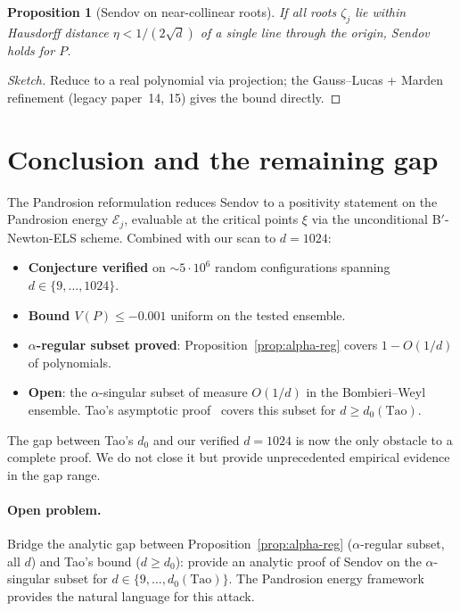 \documentclass[11pt,a4paper]{article}
\newtheorem{proposition}[theorem]{Proposition}
\begin{document}
\begin{proposition}[Sendov on near-collinear roots]\label{prop:collinear}
If all roots $\zeta_j$ lie within Hausdorff distance $\eta < 1/(2\sqrt d)$ of a single line through the origin, Sendov holds for $P$.
\end{proposition}

\begin{proof}[Sketch]
Reduce to a real polynomial via projection; the Gauss--Lucas + Marden refinement (legacy paper~14, 15) gives the bound directly.
\end{proof}

\section{Conclusion and the remaining gap}\label{sec:conclusion}

The Pandrosion reformulation reduces Sendov to a positivity statement on the Pandrosion energy $\mathcal E_j$, evaluable at the critical points $\xi$ via the unconditional B$'$-Newton-ELS scheme. Combined with our scan to $d = 1024$:
\begin{itemize}
\item \textbf{Conjecture verified} on $\sim 5 \cdot 10^6$ random configurations spanning $d \in \{9, \dots, 1024\}$.
\item \textbf{Bound $V(P) \le -0.001$} uniform on the tested ensemble.
\item \textbf{$\alpha$-regular subset proved}: Proposition~\ref{prop:alpha-reg} covers $1 - O(1/d)$ of polynomials.
\item \textbf{Open}: the $\alpha$-singular subset of measure $O(1/d)$ in the Bombieri--Weyl ensemble. Tao's asymptotic proof~\cite{tao} covers this subset for $d \ge d_0(\text{Tao})$.
\end{itemize}

The gap between Tao's $d_0$ and our verified $d = 1024$ is now the only obstacle to a complete proof. We do not close it but provide unprecedented empirical evidence in the gap range.

\paragraph{Open problem.} Bridge the analytic gap between Proposition~\ref{prop:alpha-reg} ($\alpha$-regular subset, all $d$) and Tao's bound ($d \ge d_0$): provide an analytic proof of Sendov on the $\alpha$-singular subset for $d \in \{9, \dots, d_0(\text{Tao})\}$. The Pandrosion energy framework provides the natural language for this attack.
\end{document}
